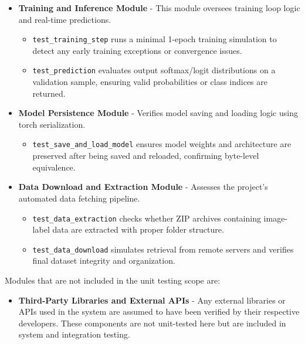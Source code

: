 \documentclass[12pt, titlepage]{article}
\begin{document}
\begin{itemize}
  \item \textbf{Training and Inference Module} - This module oversees training loop logic and real-time predictions.
    \begin{itemize}
      \item \verb|test_training_step| runs a minimal 1-epoch training simulation to detect any early training exceptions or convergence issues.
      \item \verb|test_prediction| evaluates output softmax/logit distributions on a validation sample, ensuring valid probabilities or class indices are returned.
    \end{itemize}

  \item \textbf{Model Persistence Module} - Verifies model saving and loading logic using torch serialization.
    \begin{itemize}
      \item \verb|test_save_and_load_model| ensures model weights and architecture are preserved after being saved and reloaded, confirming byte-level equivalence.
    \end{itemize}

  \item \textbf{Data Download and Extraction Module} - Assesses the project's automated data fetching pipeline.
    \begin{itemize}
      \item \verb|test_data_extraction| checks whether ZIP archives containing image-label data are extracted with proper folder structure.
      \item \verb|test_data_download| simulates retrieval from remote servers and verifies final dataset integrity and organization.
    \end{itemize}
\end{itemize}




Modules that are not included in the unit testing scope are:
\begin{itemize}
  \item \textbf{Third-Party Libraries and External APIs} - Any external libraries or APIs used in the system are assumed to have been verified by their respective developers. These components are not unit-tested here but are included in system and integration testing.
\end{itemize}
\end{document}
